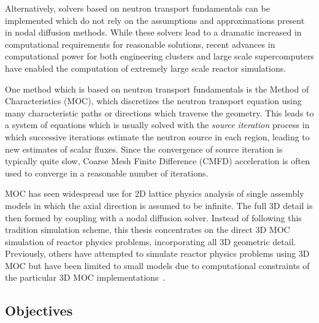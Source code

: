 \documentclass[12pt,twoside]{mitthesis-exec}
\begin{document}
 
Alternatively, solvers based on neutron transport fundamentals can be implemented which do not rely on the assumptions and approximations present in nodal diffusion methods. While these solvers lead to a dramatic increased in computational requirements for reasonable solutions, recent advances in computational power for both engineering clusters and large scale supercomputers have enabled the computation of extremely large scale reactor simulations.


One method which is based on neutron transport fundamentals is the Method of Characteristics (MOC), which discretizes the neutron transport equation using many characteristic paths or directions which traverse the geometry. This leads to a system of equations which is usually solved with the \textit{source iteration} process in which successive iterations estimate the neutron source in each region, leading to new estimates of scalar fluxes. Since the convergence of source iteration is typically quite slow, Coarse Mesh Finite Difference (CMFD) acceleration is often used to converge in a reasonable number of iterations.

MOC has seen widespread use for 2D lattice physics analysis of single assembly models in which the axial direction is assumed to be infinite. The full 3D detail is then formed by coupling with a nodal diffusion solver. Instead of following this tradition simulation scheme, this thesis concentrates on the direct 3D MOC simulation of reactor physics problems, incorporating all 3D geometric detail. Previously, others have attempted to simulate reactor physics problems using 3D MOC but have been limited to small models due to computational constraints of the particular 3D MOC implementations~\cite{kochunas}.

\subsection*{Objectives}
\end{document}
